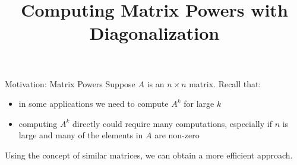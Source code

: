 \title{Computing Matrix Powers with Diagonalization}
\subtitle{\SubTitleName}
\institute[]{\Course}
\author{\Instructor}
\maketitle   

\vspace{1cm} 




\begin{frame}{Motivation: Matrix Powers}
    Suppose $A$ is an $n\times n$ matrix. Recall that:
    \begin{itemize}
        \item in some applications we need to compute $A^k$ for large $k$
        \item computing $A^k$ directly could require many computations, especially if $n$ is large and many of the elements in $A$ are non-zero
   \end{itemize}
   \pause 
   
    Using the concept of similar matrices, we can obtain a more efficient approach. 
\end{frame}





